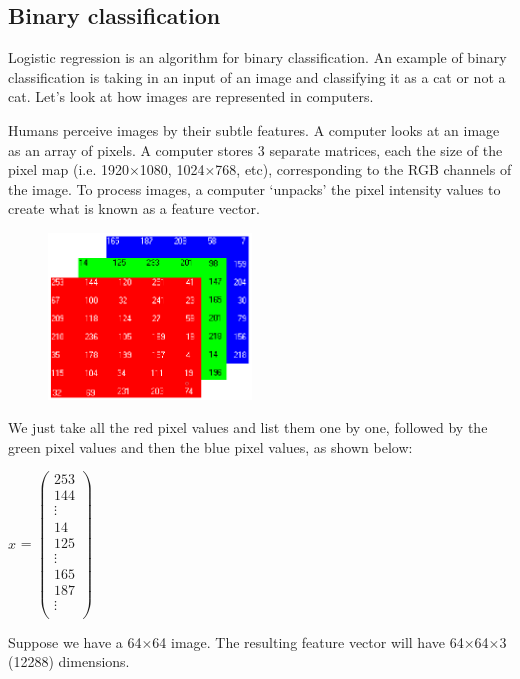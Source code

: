 \documentclass{article}[a4paper,12pt]
\theoremstyle{definition}
\begin{document}
\subsection{Binary classification}
Logistic regression is an algorithm for binary classification. An example of binary classification is taking in an input of an image and classifying it as a cat or not a cat. Let's look at how images are represented in computers.
\vspace{6pt}

Humans perceive images by their subtle features. A computer looks at an image as an array of pixels. A computer stores 3 separate matrices, each the size of the pixel map (i.e. 1920$\times$1080, 1024$\times$768, etc), corresponding to the RGB channels of the image. To process images, a computer `unpacks' the pixel intensity values to create what is known as a feature vector. 

\begin{figure}
\centering \includegraphics[width=0.48\textwidth]{rgb_matrices.png}
\end{figure}

We just take all the red pixel values and list them one by one, followed by the green pixel values and then the blue pixel values, as shown below:
\begin{center}
$x$ =
$\begin{pmatrix}
	253\\
	144\\
	\vdots\\
	14\\
	125\\
	\vdots\\
	165\\
	187\\
	\vdots\\
\end{pmatrix}$
\end{center}
Suppose we have a 64$\times$64 image. The resulting feature vector will have 64$\times$64$\times$3 (12288) dimensions.
\vspace{-6pt}
\end{document}
